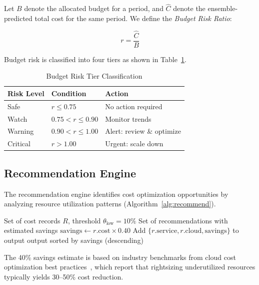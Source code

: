 \documentclass[conference]{IEEEtran}
\begin{document}
Let $B$ denote the allocated budget for a period, and $\hat{C}$ denote the ensemble-predicted total cost for the same period. We define the \emph{Budget Risk Ratio}:

\begin{equation}
r = \frac{\hat{C}}{B}
\label{eq:riskratio}
\end{equation}

Budget risk is classified into four tiers as shown in Table~\ref{tab:risktiers}.

\begin{table}[htbp]
\caption{Budget Risk Tier Classification}
\label{tab:risktiers}
\centering
\begin{tabular}{@{}lll@{}}
\toprule
\textbf{Risk Level} & \textbf{Condition} & \textbf{Action} \\
\midrule
Safe & $r \leq 0.75$ & No action required \\
Watch & $0.75 < r \leq 0.90$ & Monitor trends \\
Warning & $0.90 < r \leq 1.00$ & Alert: review \& optimize \\
Critical & $r > 1.00$ & Urgent: scale down \\
\bottomrule
\end{tabular}
\end{table}

\subsection{Recommendation Engine}

The recommendation engine identifies cost optimization opportunities by analyzing resource utilization patterns (Algorithm~\ref{alg:recommend}).

\begin{algorithm}[htbp]
\caption{Cost Optimization Recommendation}
\label{alg:recommend}
\begin{algorithmic}[1]
\REQUIRE Set of cost records $R$, threshold $\theta_{\text{low}} = 10\%$
\ENSURE Set of recommendations with estimated savings
        \STATE $\text{savings} \leftarrow r.\text{cost} \times 0.40$
        \STATE Add $\{r.\text{service}, r.\text{cloud}, \text{savings}\}$ to output
    \ENDIF
\ENDFOR
\RETURN output sorted by savings (descending)
\end{algorithmic}
\end{algorithm}

The 40\% savings estimate is based on industry benchmarks from cloud cost optimization best practices~\cite{aws2023}, which report that rightsizing underutilized resources typically yields 30--50\% cost reduction.
\end{document}
